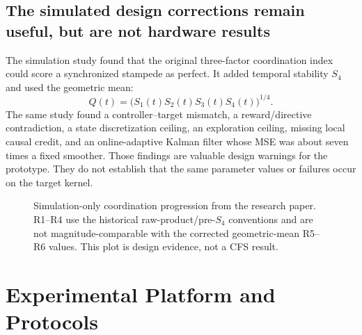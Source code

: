 \documentclass[10pt,letterpaper,twocolumn]{article}
\begin{document}
\subsection{The simulated design corrections remain useful, but are not hardware results}

The simulation study found that the original three-factor coordination index could score a synchronized stampede as perfect. It added temporal stability $S_4$ and used the geometric mean:
\begin{equation}
  Q(t) = \bigl(S_1(t)S_2(t)S_3(t)S_4(t)\bigr)^{1/4}.
\end{equation}
The same study found a controller--target mismatch, a reward/directive contradiction, a state discretization ceiling, an exploration ceiling, missing local causal credit, and an online-adaptive Kalman filter whose MSE was about seven times a fixed smoother. Those findings are valuable design warnings for the prototype. They do not establish that the same parameter values or failures occur on the target kernel.

\begin{figure}[t]
\centering
{}
\caption{Simulation-only coordination progression from the research paper. R1--R4 use the historical raw-product/pre-$S_4$ conventions and are not magnitude-comparable with the corrected geometric-mean R5--R6 values. This plot is design evidence, not a CFS result.}
\label{fig:simulation-q}
\end{figure}

\section{Experimental Platform and Protocols}
\end{document}
